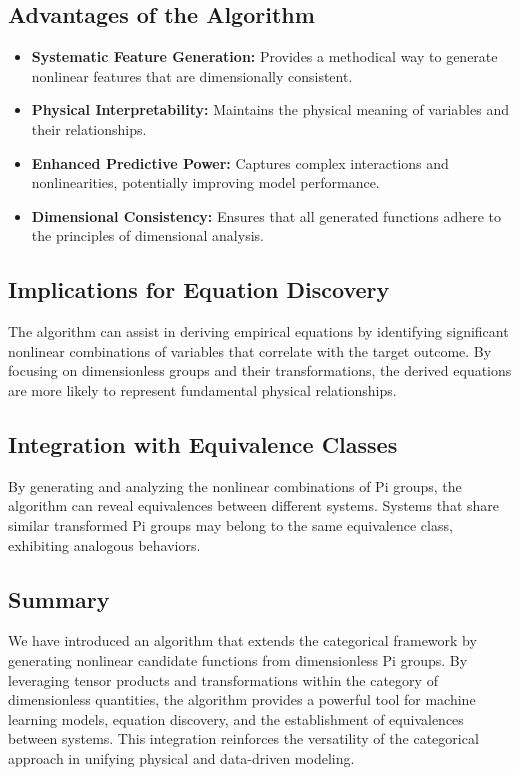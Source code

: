 \documentclass{article}
\theoremstyle{definition}
\theoremstyle{remark}
\begin{document}
\subsection{Advantages of the Algorithm}

\begin{itemize}
	\item \textbf{Systematic Feature Generation:} Provides a methodical way to generate nonlinear features that are dimensionally consistent.
	\item \textbf{Physical Interpretability:} Maintains the physical meaning of variables and their relationships.
	\item \textbf{Enhanced Predictive Power:} Captures complex interactions and nonlinearities, potentially improving model performance.
	\item \textbf{Dimensional Consistency:} Ensures that all generated functions adhere to the principles of dimensional analysis.
\end{itemize}

\subsection{Implications for Equation Discovery}

The algorithm can assist in deriving empirical equations by identifying significant nonlinear combinations of variables that correlate with the target outcome. By focusing on dimensionless groups and their transformations, the derived equations are more likely to represent fundamental physical relationships.

\subsection{Integration with Equivalence Classes}

By generating and analyzing the nonlinear combinations of Pi groups, the algorithm can reveal equivalences between different systems. Systems that share similar transformed Pi groups may belong to the same equivalence class, exhibiting analogous behaviors.

\subsection{Summary}

We have introduced an algorithm that extends the categorical framework by generating nonlinear candidate functions from dimensionless Pi groups. By leveraging tensor products and transformations within the category of dimensionless quantities, the algorithm provides a powerful tool for machine learning models, equation discovery, and the establishment of equivalences between systems. This integration reinforces the versatility of the categorical approach in unifying physical and data-driven modeling.
\end{document}
